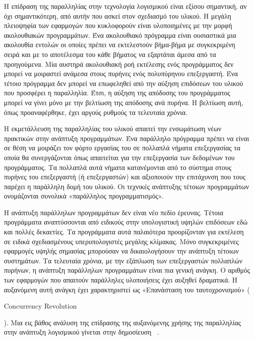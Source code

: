 Η επίδραση της παραλληλίας στην τεχνολογία λογισμικού είναι εξίσου σημαντική, αν όχι σημαντικότερη, από αυτήν  που ασκεί στον σχεδιασμό του υλικού. Η μεγάλη πλειοψηφία των εφαρμογών που κυκλοφορούν είναι υλοποιημένες με την μορφή ακολουθιακών προγραμμάτων. Ένα ακολουθιακό πρόγραμμα είναι ουσιαστικά μια ακολουθία εντολών οι οποίες πρέπει να εκτελεστούν βήμα-βήμα με συγκεκριμένη σειρά και με το αποτέλεσμα του κάθε βήματος να εξαρτάται άμεσα από τα προηγούμενα. Μία αυστηρά ακολουθιακή ροή εκτέλεσης ενός προγράμματος δεν μπορεί να μοιραστεί ανάμεσα στους πυρήνες ενός πολυπύρηνου επεξεργαστή. Ένα τέτοιο πρόγραμμα δεν μπορεί να επωφεληθεί από την αύξηση επιδόσεων του υλικού που προσφέρει η παραλληλία. Έτσι, η αύξηση της απόδοσης του προγράμματος μπορεί να γίνει μόνο με την βελτίωση της απόδοσης ανά πυρήνα. Η βελτίωση αυτή, όπως προαναφέρθηκε, έχει αργούς ρυθμούς τα τελευταία χρόνια.

H εκμετάλλευση της παραλληλίας του υλικού απαιτεί την ενσωμάτωση νέων πρακτικών στην ανάπτυξη προγραμμάτων. Ένα παράλληλο πρόγραμμα πρέπει να είναι σε θέση να μοιράζει τον φόρτο εργασίας του σε πολλαπλά νήματα επεξεργασίας τα οποία θα συνεργάζονται όπως απαιτείται για την επεξεργασία των δεδομένων του προγράμματος. Τα πολλαπλά αυτά νήματα κατανέμονται από το σύστημα στους πυρήνες του επεξεργαστή (ή επεξεργαστών) και αξιοποιούν την επιτάχυνση που τους παρέχει η παράλληλη δομή του υλικού. Οι τεχνικές ανάπτυξης τέτοιων προγραμμάτων ονομάζονται συνολικά «παράλληλος προγραμματισμός». 

Η ανάπτυξη παράλληλων προγραμμάτων δεν είναι νέο πεδίο έρευνας. Τέτοια προγράμματα αναπτύσσονται από ειδικούς στην υπολογιστική υψηλών επιδόσεων εδώ και πολλές δεκαετίες. Τα προγράμματα αυτά παλαιότερα προορίζονταν για εκτέλεση σε ειδικά σχεδιασμένους υπερυπολογιστές μεγάλης κλίμακας. Μόνο συγκεκριμένες εφαρμογές υψηλής σημασίας μπορούσαν να δικαιολογήσουν την ανάπτυξη τέτοιων συστημάτων. Τα τελευταία χρόνια, με την εξάπλωση των επεξεργαστών πολλαπλών πυρήνων, η ανάπτυξη παράλληλων προγραμμάτων είναι πια γενική ανάγκη. Ο αριθμός των εφαρμογών που απαιτούν παράλληλες υλοποιήσεις έχει αυξηθεί δραματικά. Η αυξανόμενη αυτή ανάγκη έχει χαρακτηριστεί ως «Επανάσταση του ταυτοχρονισμού» (\begin{english}Concurrency Revolution\end{english}). Μια εις βάθος ανάλυση της επίδρασης της αυξανόμενης χρήσης της παραλληλίας στην ανάπτυξη λογισμικού γίνεται στην δημοσίευση ~\cite{Sutter:2005:SCR:1095408.1095421}. 

